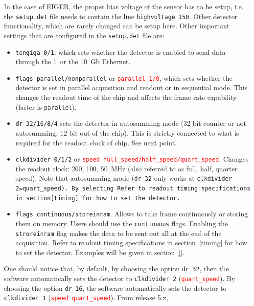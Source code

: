\documentclass{article}
\newcommand{\E}{EIGER\xspace}
\begin{document}
In the case of \E, the proper bias voltage of the sensor has to be setup, i.e. the {\tt{setup.det}} file needs to contain the line {\tt{highvoltage 150}}. Other detector functionality, which are rarely changed can be setup here. 
Other important settings that are configured in the {\tt{setup.det}} file are:
\begin{itemize}
\item {\tt{tengiga 0/1}}, which sets whether the detector is enabled to send data through the 1~or the 10~Gb Ethernet.
\item {\tt{flags parallel/nonparallel}} or {\tt{\textcolor{red}{parallel 1/0}}}, which sets whether the detector is set in parallel acquisition and readout or in sequential mode. This changes the readout time of the chip and affects the frame rate capability (faster is {\tt{parallel}}).
\item {\tt{dr 32/16/8/4}} sets the detector in autosumming mode (32 bit counter or not autosumming, 12 bit out of the chip). This is strictly connected to what is required for the readout clock of chip. See next point.
\item {\tt{clkdivider 0/1/2}} or {\tt{\textcolor{red}{speed full\_speed/half\_speed/quart\_speed}}}. Changes the readout clock: 200, 100, 50~MHz (also referred to as full, half, quarter speed). Note that autosumming mode ({\tt{dr 32}} only works at \tt{clkdivider 2}=\tt{quart\_speed}). By selecting Refer to readout timing specifications in~section\ref{timing} for how to set the detector. 
\item {\tt{flags continuous/storeinram}}. Allows to take frame continuously or storing them on memory. Users should use the {\tt{continuous}} flags. Enabling the {\tt{stroreinram}} flag makes the data to be sent out all at the end of the acquisition. Refer to readout timing specifications in section~\ref{timing} for how to set the detector. Examples will be given in section~\ref{}.
\end{itemize}

One should notice that, by default, by choosing the option {\tt{dr 32}}, then the software automatically sets the detector to  {\tt{clkdivider 2}} ({\tt{\textcolor{red}{quart\_speed}}}). By choosing the option {\tt{dr 16}}, the software automatically sets the detector to  {\tt{clkdivider 1}} ({\tt{\textcolor{red}{speed quart\_speed}}}). From release 5.x, 
\end{document}
